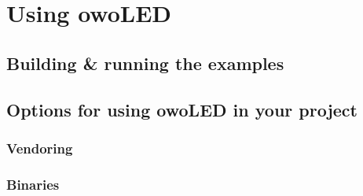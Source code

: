 \section{Using owoLED}

\subsection{Building \& running the examples}
\subsection{Options for using owoLED in your project}
\subsubsection{Vendoring}
\subsubsection{Binaries}


